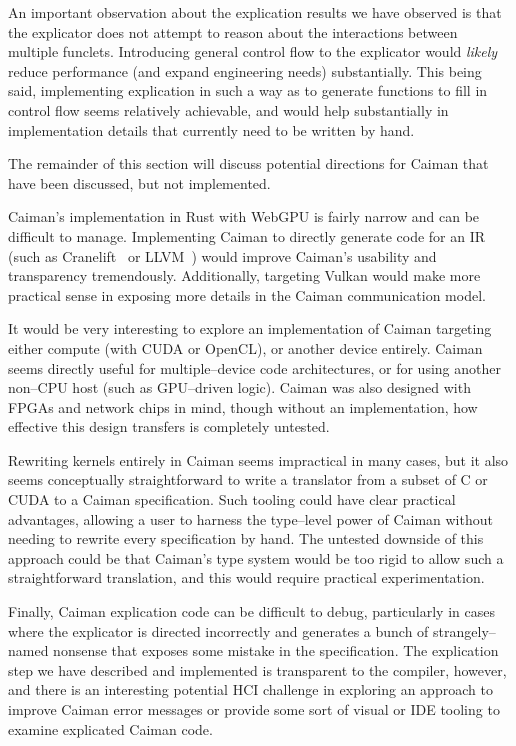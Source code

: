 An important observation about the explication results we have observed is that the explicator does not attempt to reason about the interactions between multiple funclets.  Introducing general control flow to the explicator would \emph{likely} reduce performance (and expand engineering needs) substantially.  This being said, implementing explication in such a way as to generate functions to fill in control flow seems relatively achievable, and would help substantially in implementation details that currently need to be written by hand.

The remainder of this section will discuss potential directions for Caiman that have been discussed, but not implemented.

Caiman's implementation in Rust with WebGPU is fairly narrow and can be difficult to manage.  Implementing Caiman to directly generate code for an IR (such as Cranelift~\cite{cranelift} or LLVM~\cite{llvm}) would improve Caiman's usability and transparency tremendously.  Additionally, targeting Vulkan would make more practical sense in exposing more details in the Caiman communication model.

It would be very interesting to explore an implementation of Caiman targeting either compute (with CUDA or OpenCL), or another device entirely.  Caiman seems directly useful for multiple--device code architectures, or for using another non--CPU host (such as GPU--driven logic).  Caiman was also designed with FPGAs and network chips in mind, though without an implementation, how effective this design transfers is completely untested.

Rewriting kernels entirely in Caiman seems impractical in many cases, but it also seems conceptually straightforward to write a translator from a subset of C or CUDA to a Caiman specification.  Such tooling could have clear practical advantages, allowing a user to harness the type--level power of Caiman without needing to rewrite every specification by hand.  The untested downside of this approach could be that Caiman's type system would be too rigid to allow such a straightforward translation, and this would require practical experimentation.

Finally, Caiman explication code can be difficult to debug, particularly in cases where the explicator is directed incorrectly and generates a bunch of strangely--named nonsense that exposes some mistake in the specification.  The explication step we have described and implemented is transparent to the compiler, however, and there is an interesting potential HCI challenge in exploring an approach to improve Caiman error messages or provide some sort of visual or IDE tooling to examine explicated Caiman code.